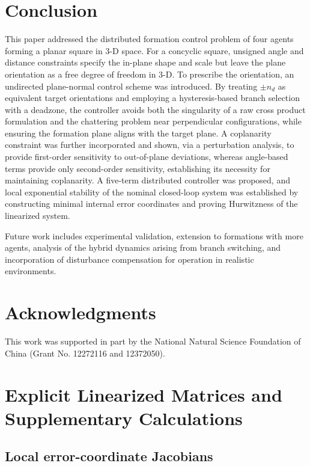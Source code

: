 \documentclass[letterpaper,journal]{IEEEtran}
\theoremstyle{plain}
\theoremstyle{definition}
\theoremstyle{remark}
\begin{document}
\section{Conclusion}
This paper addressed the distributed formation control problem of four agents forming a planar square in 3-D space. For a concyclic square, unsigned angle and distance constraints specify the in-plane shape and scale but leave the plane orientation as a free degree of freedom in 3-D. To prescribe the orientation, an undirected plane-normal control scheme was introduced. By treating \(\pm n_d\) as equivalent target orientations and employing a hysteresis-based branch selection with a deadzone, the controller avoids both the singularity of a raw cross product formulation and the chattering problem near perpendicular configurations, while ensuring the formation plane aligns with the target plane. A coplanarity constraint was further incorporated and shown, via a perturbation analysis, to provide first-order sensitivity to out-of-plane deviations, whereas angle-based terms provide only second-order sensitivity, establishing its necessity for maintaining coplanarity. A five-term distributed controller was proposed, and local exponential stability of the nominal closed-loop system was established by constructing minimal internal error coordinates and proving Hurwitzness of the linearized system.

Future work includes experimental validation, extension to formations with more agents, analysis of the hybrid dynamics arising from branch switching, and incorporation of disturbance compensation for operation in realistic environments.

\section*{Acknowledgments}

This work was supported in part by the National Natural Science Foundation of China (Grant No. 12272116 and 12372050).

\appendices
\section{Explicit Linearized Matrices and Supplementary Calculations}

\subsection{Local error-coordinate Jacobians}
\label{app:error-jacobians}
\end{document}
